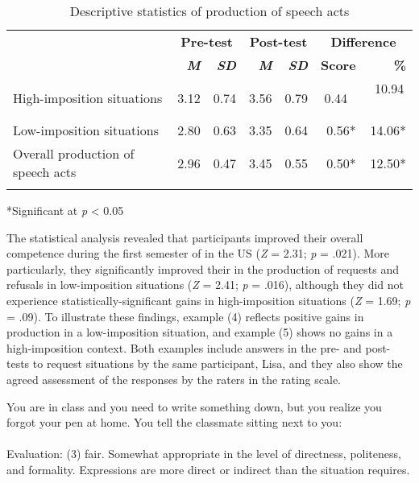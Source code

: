 \documentclass[output=paper]{langsci/langscibook}
\begin{document}
\begin{table}
\caption{Descriptive statistics of production of speech acts}
\label{tab:sanchez:4}
\begin{tabularx}{\textwidth}{lrrrrrr}
\lsptoprule
& \multicolumn{2}{c}{\bfseries Pre-test} & \multicolumn{2}{c}{\bfseries Post-test} & \multicolumn{2}{c}{\bfseries Difference}\\
& \bfseries \textit{M} & \bfseries \textit{SD} & \bfseries \textit{M} & \bfseries \textit{SD} & \bfseries Score & \bfseries \%\\
\midrule
High-imposition situations & 3.12 & 0.74 & 3.56 & 0.79 & 0.44\,~ & 10.94\,~ \\
Low-imposition situations & 2.80 & 0.63 & 3.35 & 0.64 &  0.56* &  14.06*\\
\midrule
Overall production of speech acts & 2.96 & 0.47 & 3.45 & 0.55 &  0.50* &  12.50*\\
\lspbottomrule
\end{tabularx}
\footnotesize
*Significant at \textit{p} < 0.05
\end{table}

The statistical analysis revealed that participants improved their overall  competence during the first semester of  in the US (\textit{Z} = 2.31; \textit{p} = .021). More particularly, they significantly improved their  in the production of requests and refusals in low-imposition situations (\textit{Z} = 2.41; \textit{p} = .016), although they did not experience statistically-significant  gains in high-imposition situations (\textit{Z} = 1.69; \textit{p} = .09). To illustrate these findings, example (4) reflects positive gains in  production in a low-imposition situation, and example (5) shows no gains in a high-imposition context. Both examples include answers in the pre- and post-tests to request situations by the same participant, Lisa, and they also show the agreed assessment of the responses by the raters in the  rating scale.

\ea
{You are in class and you need to write something down, but you realize you forgot your pen at home. You tell the classmate sitting next to you:}\\
  \\
  \textup{Evaluation}: (3) fair. Somewhat appropriate in the level of directness, politeness, and formality. Expressions are more direct or indirect than the situation requires.\\
\end{document}
